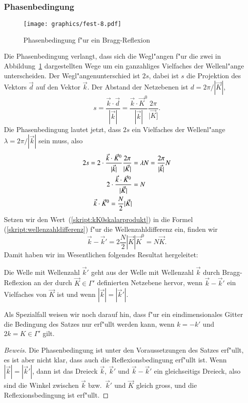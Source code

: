 \subsubsection{Phasenbedingung}
\begin{figure}
\centering
\texttt{[image: graphics/fest-8.pdf]}
\caption{Phasenbedingung f"ur ein Bragg-Reflexion
\label{skript:phasenbedingung}}
\end{figure}
Die Phasenbedingung verlangt, dass sich die Wegl"angen f"ur die zwei in
Abbildung~\ref{skript:phasenbedingung} dargestellten Wege um ein
ganzahliges Vielfaches der Wellenl"ange unterscheiden.
Der Wegl"angenunterschied ist $2s$, dabei ist $s$ die Projektion des
Vektors $\vec d$ auf den Vektor $\vec k$. Der Abstand der Netzebenen
ist $d=2\pi / |\vec K|$,
\[
s
=
\frac{\vec k\cdot \vec d}{|\vec k|}
=
\frac{\vec k\cdot \vec K^0}{|\vec k|}\frac{2\pi}{|\vec K]}.
\]
Die Phasenbedingung lautet jetzt, dass $2s$ ein Vielfaches der Wellenl"ange
$\lambda = 2\pi/|\vec k|$ sein muss, also
\begin{align}
2s
=
2\cdot \frac{\vec k\cdot \vec K^0}{|\vec k|}\frac{2\pi}{|\vec K|}
&=
\lambda N
=
\frac{2\pi}{|\vec k|} N
\notag
\\
2\cdot \frac{\vec k\cdot \vec K^0}{|\vec K|}
&=
N
\notag
\\
\vec k\cdot \vec K^0=\frac{N}2 |\vec K|
\label{skript:kK0skalarprodukt}
\end{align}
Setzen wir den Wert~(\ref{skript:kK0skalarprodukt}) in die Formel
(\ref{skript:wellenzahldifferenz})
f"ur die Wellenzahldifferenz ein, finden wir
\[
\vec k-\vec k'=2 \frac{N}2 |\vec K|\vec K^0=N\vec K.
\]
Damit haben wir im Wesentlichen folgendes Resultat hergeleitet:
\begin{satz}
\label{skript:braggsatz}
Die Welle mit Wellenzahl $\vec k'$ geht aus der Welle mit Wellenzahl
$\vec k$ durch
Bragg-Reflexion an der durch $\vec K\in\Gamma'$ definierten Netzebene
hervor, wenn $\vec k-\vec k'$ ein Vielfaches von $\vec K$ ist und
wenn $|\vec k|=|\vec k'|$.
\end{satz}

Als Spezialfall weisen wir noch darauf hin, dass f"ur ein eindimensionales
Gitter die Bedingung des Satzes nur erf"ullt werden kann, wenn
$k=-k'$ und $2k=K\in\Gamma'$ gilt.

\begin{proof}[Beweis]
Die Phasenbedingung ist unter den Voraussetzungen des Satzes erf"ullt,
es ist aber nicht klar, dass auch die Reflexionsbedingung erf"ullt ist.
Wenn $|\vec k|=|\vec k'|$, dann ist das Dreieck $\vec k$, $\vec k'$
und $\vec k- \vec k'$ ein gleichseitigs Dreieck, also sind die Winkel
zwischen $\vec k$ bzw.~$\vec k'$ und $\vec K$ gleich gross, und die
Reflexionsbedingung ist erf"ullt.
\end{proof}


